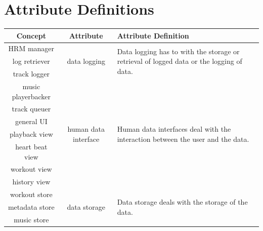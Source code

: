\documentclass[letterpaper,english, 12pt]{scrreprt}
\begin{document}
    \section{Attribute Definitions}
		\begin{center}
			\renewcommand{\arraystretch}{1.5}
	        \begin{tabular}[h]{| c | c | m{} |}
	            \hline
	            Concept & Attribute & Attribute Definition\\
	            \hline			
	            HRM manager & \multirow{3}{*}{data logging} & \multirow{3}{0.4\textwidth}{Data logging has to with the storage or retrieval of logged data or the logging of data.} \\
				\cline{1-1}
	            log retriever & & \\
				\cline{1-1}
	            track logger & & \\
				\hline
	            music playerbacker & \multirow{7}{*}{human data interface} & \multirow{7}{0.4\textwidth}{Human data interfaces deal with the interaction between the user and the data.}\\
				\cline{1-1}
	            track queuer & &\\
				\cline{1-1}
	            general UI & &\\
				\cline{1-1}
	            playback view &&\\
				\cline{1-1}
	            heart beat view & &\\
				\cline{1-1}
	            workout view & & \\
				\cline{1-1}
	            history view & &\\
				\hline
	            workout store & \multirow{3}{*}{data storage} & \multirow{3}{0.4\textwidth}{Data storage deals with the storage of the data.}\\
				\cline{1-1}
	            metadata store & &\\
				\cline{1-1}
	            music store & &\\
	            \hline
	        \end{tabular}
		\end{center}
\end{document}
